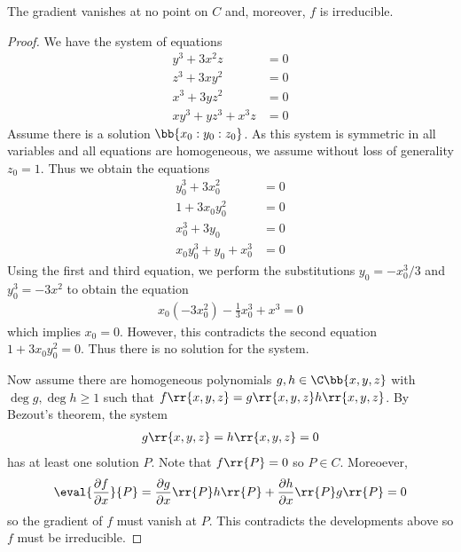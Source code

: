 \documentclass{article}
\begin{document}
\begin{claim*}[1]
  The gradient vanishes at no point on $C$ and, moreover, $f$ is irreducible.
  \begin{proof}
    We have the system of equations
    \begin{align*}
      y^3 + 3x^2z &= 0\\
      z^3 + 3xy^2 &= 0\\
      x^3 + 3yz^2 &= 0\\
      xy^3 + yz^3 + x^3z &= 0
    \end{align*}
    Assume there is a solution $\bb{x_0:y_0:z_0}$. As this system is symmetric in all variables
    and all equations are homogeneous, we assume without loss of generality $z_0=1$.
    Thus we obtain the equations
    \begin{align*}
      y_0^3 + 3x_0^2 &= 0\\
      1 + 3x_0y_0^2 &= 0\\
      x_0^3 + 3y_0 &= 0\\
      x_0y_0^3 + y_0 + x_0^3 &= 0
    \end{align*}
    Using the first and third equation, we perform the substitutions $y_0=-x_0^3/3$
    and $y_0^3=-3x^2$ to obtain the equation
    \begin{align*}
      x_0(-3x_0^2) - \frac{1}{3}x_0^3 + x^3 = 0
    \end{align*}
    which implies $x_0=0$. However, this contradicts the second equation
    $1 + 3x_0y_0^2 = 0$. Thus there is no solution for the system.

    Now assume there are homogeneous polynomials $g,h\in\C\bb{x,y,z}$ with
    $\deg g,\deg h\geq 1$ such that $f\rr{x,y,z}=g\rr{x,y,z}h\rr{x,y,z}$.
    By Bezout's theorem, the system
    \begin{align*}
      g\rr{x,y,z}=h\rr{x,y,z}=0
    \end{align*}
    has at least one solution $P$. Note that $f\rr{P}=0$ so $P\in C$. Moreoever,
    \begin{align*}
      \eval{\frac{\partial f}{\partial x}}{P}
      =\frac{\partial g}{\partial x}\rr{P}h\rr{P}
      +\frac{\partial h}{\partial x}\rr{P}g\rr{P}
      = 0
    \end{align*}
    so the gradient of $f$ must vanish at $P$. This contradicts the developments above
    so $f$ must be irreducible.
  \end{proof}
\end{claim*}
\end{document}
